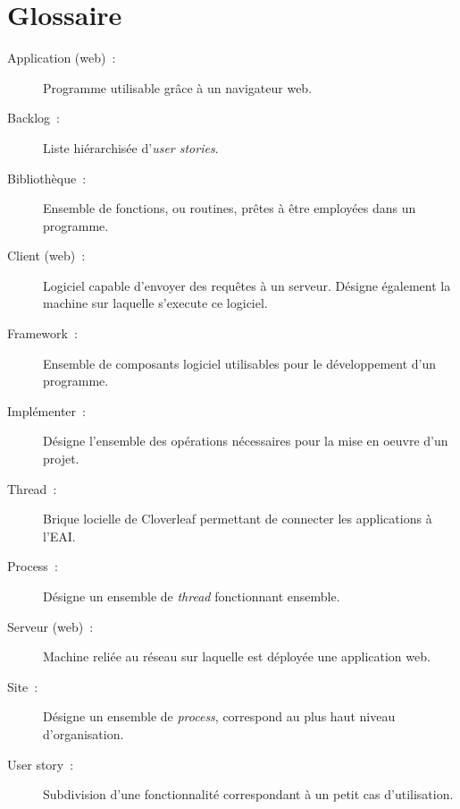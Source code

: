 \chapter*{Glossaire}
	\begin{description}
		\item[Application (web)~:] Programme utilisable grâce à un navigateur web.
		\item[Backlog~:] Liste hiérarchisée d'\textit{user stories}.
		\item[Bibliothèque~:] Ensemble de fonctions, ou routines, prêtes à être
		employées dans un programme.
		\item[Client (web)~:] Logiciel capable d'envoyer des requêtes à un serveur.
		Désigne également la machine sur laquelle s'execute ce logiciel.
		\item[Framework~:] Ensemble de composants logiciel utilisables pour le
		développement d'un programme.
		\item[Implémenter~:] Désigne l'ensemble des opérations nécessaires pour la
		mise en oeuvre d'un projet.
		\item[Thread~:] Brique locielle de Cloverleaf permettant de connecter les
		applications à l'EAI.
		\item[Process~:] Désigne un ensemble de \textit{thread} fonctionnant ensemble.
		\item[Serveur (web)~:] Machine reliée au réseau sur laquelle est déployée une
		application web.
		\item[Site~:] Désigne un ensemble de \textit{process}, correspond au plus haut
		niveau d'organisation.
		\item[User story~:] Subdivision d'une fonctionnalité correspondant à un petit
		cas d'utilisation.
	\end{description}